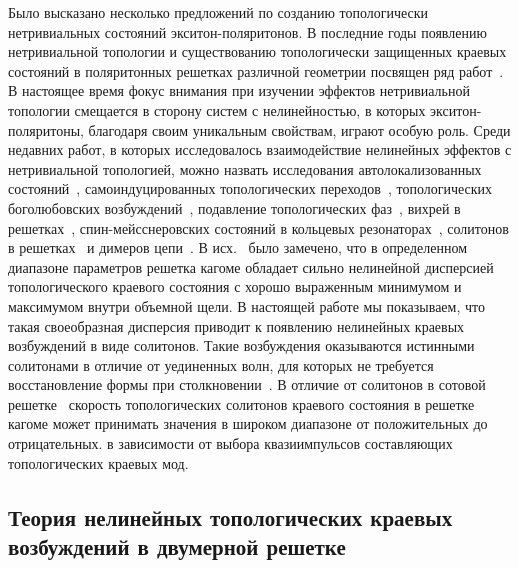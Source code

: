 \documentclass[
aps,
prl,
groupedaddress,
superscriptaddress,
floatfix,
notitlepage
]{revtex4-1}
\begin{document}
Было высказано несколько предложений по созданию топологически нетривиальных состояний экситон-поляритонов. В последние годы появлению нетривиальной топологии и существованию топологически защищенных краевых состояний в поляритонных решетках различной геометрии посвящен ряд работ~\cite{Karzig-PRX-2015, Bardyn-PRB-2015, Nalitov-Z, Yi-PRB-2016, Bardyn-PRB-2016, Janot-PRB-2016, Gulevich-kagome}.
В настоящее время фокус внимания при изучении эффектов нетривиальной топологии смещается в сторону систем с нелинейностью, в которых экситон-поляритоны, благодаря своим уникальным свойствам, играют особую роль. Среди недавних работ, в которых исследовалось взаимодействие нелинейных эффектов с нетривиальной топологией, можно назвать исследования автолокализованных состояний~\cite{Lumer-PRL-2013, Ostrovskaya2013}, самоиндуцированных топологических переходов~\cite{Hadad-PRB-2016}, топологических боголюбовских возбуждений~\cite{Bardyn-PRB-2016},
подавление топологических фаз~\cite{Bleu-PRB-2016}, вихрей в решетках~\cite{Kartashov-OL-2016}, спин-мейсснеровских состояний в кольцевых резонаторах~\cite{DGulevich-Meissner}, солитонов в решетках~\cite{Ablowitz-PRA-2014, Leykam-PRL-2016, Kartashov-Optica-2016, CedraMendez2016} и димеров
цепи~\cite{Soln-PRL-2017}.
В исх.~\cite{Gulevich-kagome} было замечено, что в определенном диапазоне параметров решетка кагоме обладает сильно нелинейной дисперсией топологического краевого состояния с хорошо выраженным минимумом и максимумом внутри объемной щели. В настоящей работе мы показываем, что такая своеобразная дисперсия приводит к появлению нелинейных краевых возбуждений в виде солитонов. Такие возбуждения оказываются истинными солитонами в отличие от уединенных волн, для которых не требуется восстановление формы при столкновении~\cite{Rajaraman}. В отличие от солитонов в сотовой решетке~\cite{Kartashov-Optica-2016} 
скорость топологических солитонов краевого состояния в решетке кагоме может принимать значения в широком диапазоне от положительных до отрицательных.
в зависимости от выбора квазиимпульсов составляющих топологических краевых мод.

\subsection*{Теория нелинейных топологических краевых возбуждений в двумерной решетке}
\end{document}
